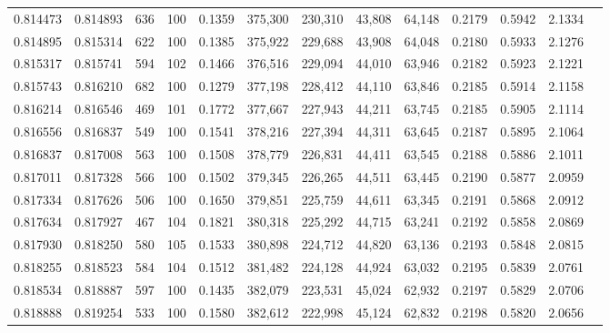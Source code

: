 \begin{tabular}{rrrrrrrrrrrrr}
0.814473 & 0.814893 &   636 & 100 &                                     0.1359 & 375,300 & 230,310 &  43,808 &  64,148 & 0.2179 & 0.5942 & 2.1334 \\
0.814895 & 0.815314 &   622 & 100 &                                     0.1385 & 375,922 & 229,688 &  43,908 &  64,048 & 0.2180 & 0.5933 & 2.1276 \\
0.815317 & 0.815741 &   594 & 102 &                                     0.1466 & 376,516 & 229,094 &  44,010 &  63,946 & 0.2182 & 0.5923 & 2.1221 \\
0.815743 & 0.816210 &   682 & 100 &                                     0.1279 & 377,198 & 228,412 &  44,110 &  63,846 & 0.2185 & 0.5914 & 2.1158 \\
0.816214 & 0.816546 &   469 & 101 &                                     0.1772 & 377,667 & 227,943 &  44,211 &  63,745 & 0.2185 & 0.5905 & 2.1114 \\
0.816556 & 0.816837 &   549 & 100 &                                     0.1541 & 378,216 & 227,394 &  44,311 &  63,645 & 0.2187 & 0.5895 & 2.1064 \\
0.816837 & 0.817008 &   563 & 100 &                                     0.1508 & 378,779 & 226,831 &  44,411 &  63,545 & 0.2188 & 0.5886 & 2.1011 \\
0.817011 & 0.817328 &   566 & 100 &                                     0.1502 & 379,345 & 226,265 &  44,511 &  63,445 & 0.2190 & 0.5877 & 2.0959 \\
0.817334 & 0.817626 &   506 & 100 &                                     0.1650 & 379,851 & 225,759 &  44,611 &  63,345 & 0.2191 & 0.5868 & 2.0912 \\
0.817634 & 0.817927 &   467 & 104 &                                     0.1821 & 380,318 & 225,292 &  44,715 &  63,241 & 0.2192 & 0.5858 & 2.0869 \\
0.817930 & 0.818250 &   580 & 105 &                                     0.1533 & 380,898 & 224,712 &  44,820 &  63,136 & 0.2193 & 0.5848 & 2.0815 \\
0.818255 & 0.818523 &   584 & 104 &                                     0.1512 & 381,482 & 224,128 &  44,924 &  63,032 & 0.2195 & 0.5839 & 2.0761 \\
0.818534 & 0.818887 &   597 & 100 &                                     0.1435 & 382,079 & 223,531 &  45,024 &  62,932 & 0.2197 & 0.5829 & 2.0706 \\
0.818888 & 0.819254 &   533 & 100 &                                     0.1580 & 382,612 & 222,998 &  45,124 &  62,832 & 0.2198 & 0.5820 & 2.0656 \\

\end{tabular}
